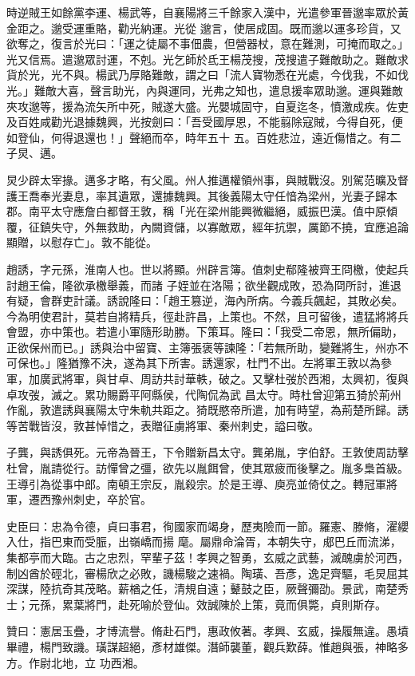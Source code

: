 \begin{pinyinscope}
 時逆賊王如餘黨李運、楊武等，自襄陽將三千餘家入漢中，光遣參軍晉邈率眾於黃金距之。邈受運重賂，勸光納運。光從
 邈言，使居成固。既而邈以運多珍貨，又欲奪之，復言於光曰：「運之徒屬不事佃農，但營器杖，意在難測，可掩而取之。」光又信焉。遣邈眾討運，不剋。光乞師於氐王楊茂搜，茂搜遣子難敵助之。難敵求貨於光，光不與。楊武乃厚賂難敵，謂之曰「流人寶物悉在光處，今伐我，不如伐光。」難敵大喜，聲言助光，內與運同，光弗之知也，遣息援率眾助邈。運與難敵夾攻邈等，援為流矢所中死，賊遂大盛。光嬰城固守，自夏迄冬，憤激成疾。佐吏及百姓咸勸光退據魏興，光按劍曰：「吾受國厚恩，不能翦除寇賊，今得自死，便如登仙，何得退還也！」聲絕而卒，時年五十
 五。百姓悲泣，遠近傷惜之。有二子炅、邁。



 炅少辟太宰掾。邁多才略，有父風。州人推邁權領州事，與賊戰沒。別駕范曠及督護王喬奉光妻息，率其遺眾，還據魏興。其後義陽太守任愔為梁州，光妻子歸本郡。南平太守應詹白都督王敦，稱「光在梁州能興微繼絕，威振巴漢。值中原傾覆，征鎮失守，外無救助，內闕資儲，以寡敵眾，經年抗禦，厲節不撓，宜應追論顯贈，以慰存亡」。敦不能從。



 趙誘，字元孫，淮南人也。世以將顯。州辟言簿。值刺史郗隆被齊王冏檄，使起兵討趙王倫，隆欲承檄舉義，而諸
 子姪並在洛陽；欲坐觀成敗，恐為冏所討，進退有疑，會群吏計議。誘說隆曰：「趙王篡逆，海內所病。今義兵飆起，其敗必矣。今為明使君計，莫若自將精兵，徑赴許昌，上策也。不然，且可留後，遣猛將將兵會盟，亦中策也。若遣小軍隨形助勝。下策耳。隆曰：「我受二帝恩，無所偏助，正欲保州而已。」誘與治中留寶、主簿張褒等諫隆：「若無所助，變難將生，州亦不可保也。」隆猶豫不決，遂為其下所害。誘還家，杜門不出。左將軍王敦以為參軍，加廣武將軍，與甘卓、周訪共討華軼，破之。又擊杜弢於西湘，太興初，復與卓攻弢，滅之。累功賜爵平阿縣侯，代陶侃為武
 昌太守。時杜曾迎第五猗於荊州作亂，敦遣誘與襄陽太守朱軌共距之。猗既愍帝所遣，加有時望，為荊楚所歸。誘等苦戰皆沒，敦甚悼惜之，表贈征虜將軍、秦州刺史，謚曰敬。



 子龔，與誘俱死。元帝為晉王，下令贈新昌太守。龔弟胤，字伯舒。王敦使周訪擊杜曾，胤請從行。訪憚曾之彊，欲先以胤餌曾，使其眾疲而後擊之。胤多梟首級。王導引為從事中郎。南頓王宗反，胤殺宗。於是王導、庾亮並倚仗之。轉冠軍將軍，遷西豫州刺史，卒於官。



 史臣曰：忠為令德，貞曰事君，徇國家而竭身，歷夷險而一節。羅憲、滕脩，濯纓入仕，指巴東而受脤，出嶺嶠而揚
 麾。屬鼎命淪胥，本朝失守，郕巴丘而流涕，集都亭而大臨。古之忠烈，罕輩子茲！孝興之智勇，玄威之武藝，滅醜虜於河西，制凶酋於硜北，審楊欣之必敗，譏楊駿之速禍。陶璜、吾彥，逸足齊驅，毛炅屈其深謀，陸抗奇其茂略。薪楢之任，清規自遠；鼙鼓之臣，厥聲彌劭。景武，南楚秀士；元孫，累葉將門，赴死喻於登仙。效誠陳於上策，竟而俱斃，貞則斯存。



 贊曰：憲居玉疊，才博流譽。脩赴石門，惠政攸著。孝興、玄威，操履無違。愚墳畢禮，楊門致譏。璜謀超絕，彥材雄傑。潛師襲董，觀兵歎薛。惟趙與張，神略多方。作尉北地，立
 功西湘。



\end{pinyinscope}
